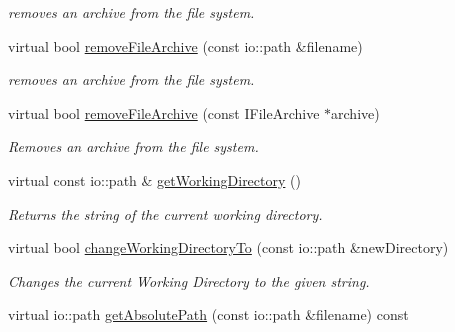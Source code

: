 \begin{DoxyCompactItemize}
\begin{DoxyCompactList}\small\item\em removes an archive from the file system. \end{DoxyCompactList}\item 
\hypertarget{classirr_1_1io_1_1_c_file_system_a01207b72b676a52feaa522e521e6e508}{virtual bool \hyperlink{classirr_1_1io_1_1_c_file_system_a01207b72b676a52feaa522e521e6e508}{remove\-File\-Archive} (const io\-::path \&filename)}\label{classirr_1_1io_1_1_c_file_system_a01207b72b676a52feaa522e521e6e508}

\begin{DoxyCompactList}\small\item\em removes an archive from the file system. \end{DoxyCompactList}\item 
\hypertarget{classirr_1_1io_1_1_c_file_system_a3d9b0ccc897abfdc22fe13e8a90b4451}{virtual bool \hyperlink{classirr_1_1io_1_1_c_file_system_a3d9b0ccc897abfdc22fe13e8a90b4451}{remove\-File\-Archive} (const I\-File\-Archive $\ast$archive)}\label{classirr_1_1io_1_1_c_file_system_a3d9b0ccc897abfdc22fe13e8a90b4451}

\begin{DoxyCompactList}\small\item\em Removes an archive from the file system. \end{DoxyCompactList}\item 
\hypertarget{classirr_1_1io_1_1_c_file_system_abca7b787fcc1dbb02214ee02d457c072}{virtual const io\-::path \& \hyperlink{classirr_1_1io_1_1_c_file_system_abca7b787fcc1dbb02214ee02d457c072}{get\-Working\-Directory} ()}\label{classirr_1_1io_1_1_c_file_system_abca7b787fcc1dbb02214ee02d457c072}

\begin{DoxyCompactList}\small\item\em Returns the string of the current working directory. \end{DoxyCompactList}\item 
virtual bool \hyperlink{classirr_1_1io_1_1_c_file_system_af12a04e907e7784c82aa9ba3bf809433}{change\-Working\-Directory\-To} (const io\-::path \&new\-Directory)
\begin{DoxyCompactList}\small\item\em Changes the current Working Directory to the given string. \end{DoxyCompactList}\item 
\hypertarget{classirr_1_1io_1_1_c_file_system_a354d1ab30e57e777bc0d8173698ae4ae}{virtual io\-::path \hyperlink{classirr_1_1io_1_1_c_file_system_a354d1ab30e57e777bc0d8173698ae4ae}{get\-Absolute\-Path} (const io\-::path \&filename) const }\label{classirr_1_1io_1_1_c_file_system_a354d1ab30e57e777bc0d8173698ae4ae}


\end{DoxyCompactItemize}
